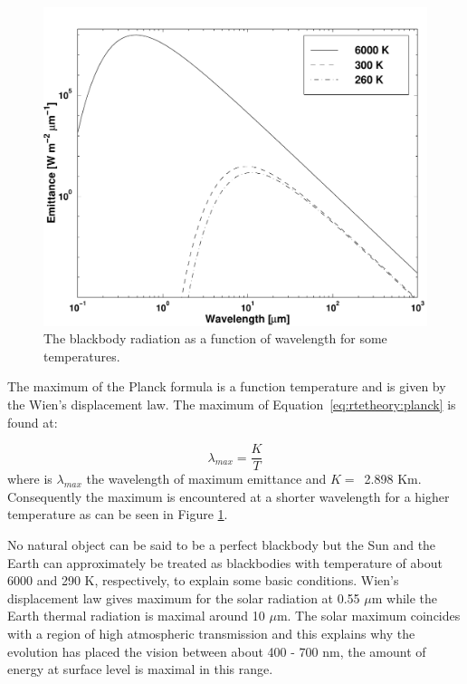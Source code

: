 \begin{figure}
  \begin{center}
   \includegraphics*[width=0.8\hsize]{fig_planck}
    \caption{The blackbody radiation as a function of wavelength for
             some temperatures.}
    \label{fig:rtetheory:planck}
  \end{center}
 \end{figure}   
                                       
 The maximum of the Planck formula is a function temperature and is
 given by the Wien's displacement law. The maximum of
 Equation~\ref{eq:rtetheory:planck} is found at: 

 \begin{equation}
   \lambda_{max} = \frac{K}{T}
  \label{eq:rtetheory:wien}
 \end{equation}
 where is $\lambda_{max}$ the wavelength of maximum emittance and $K
 =$~2.898 Km. Consequently the maximum is encountered
 at a shorter wavelength for a higher temperature as can be seen in
 Figure \ref{fig:rtetheory:planck}.
                                     
 No natural object can be said to be a perfect blackbody but the Sun
 and the Earth can approximately be treated as blackbodies with
 temperature of about 6000 and 290 K, respectively, to explain some
 basic conditions. Wien's displacement law gives maximum for the solar
 radiation at 0.55 $\mu$m while the Earth thermal radiation is maximal
 around 10 $\mu$m. The solar maximum coincides with a region of high
 atmospheric transmission and this explains why the
 evolution has placed the vision between about 400 - 700 nm, the
 amount of energy at surface level is maximal in this range.  
 
